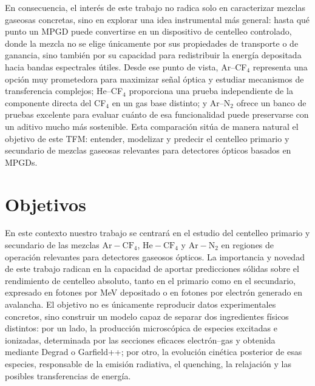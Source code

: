 \documentclass[12pt,a4paper]{article}
\newcommand{\N}{\mathrm{N}}
\newcommand{\He}{\mathrm{He}}
\newcommand{\Ar}{\mathrm{Ar}}
\newcommand{\CF}{\mathrm{CF}}
\begin{document}
En consecuencia, el interés de este trabajo no radica solo en caracterizar mezclas gaseosas concretas, sino en explorar una idea instrumental más general: hasta qué punto un MPGD puede convertirse en un dispositivo de centelleo controlado, donde la mezcla no se elige únicamente por sus propiedades de transporte o de ganancia, sino también por su capacidad para redistribuir la energía depositada hacia bandas espectrales útiles. Desde ese punto de vista, Ar--CF$_4$ representa una opción muy prometedora para maximizar señal óptica y estudiar mecanismos de transferencia complejos; He--CF$_4$ proporciona una prueba independiente de la componente directa del CF$_4$ en un gas base distinto; y Ar--N$_2$ ofrece un banco de pruebas excelente para evaluar cuánto de esa funcionalidad puede preservarse con un aditivo mucho más sostenible. Esta comparación sitúa de manera natural el objetivo de este TFM: entender, modelizar y predecir el centelleo primario y secundario de mezclas gaseosas relevantes para detectores ópticos basados en MPGDs.

\section{Objetivos}

En este contexto nuestro trabajo se centrará en el estudio del centelleo primario y secundario de las mezclas $\Ar-\CF_4$, $\He-\CF_4$ y $\Ar-\N_2$ en regiones de operación relevantes para detectores gaseosos ópticos. La importancia y novedad de este trabajo radican en la capacidad de aportar predicciones sólidas sobre el rendimiento de centelleo absoluto, tanto en el primario como en el secundario, expresado en fotones por MeV depositado o en fotones por electrón generado en avalancha. El objetivo no es únicamente reproducir datos experimentales concretos, sino construir un modelo capaz de separar dos ingredientes físicos distintos: por un lado, la producción microscópica de especies excitadas e ionizadas, determinada por las secciones eficaces electrón--gas y obtenida mediante Degrad o Garfield++; por otro, la evolución cinética posterior de esas especies, responsable de la emisión radiativa, el quenching, la relajación y las posibles transferencias de energía.
\end{document}
